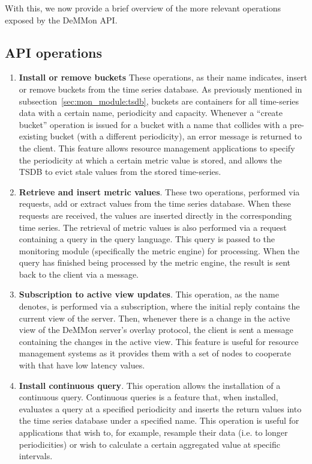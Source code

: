 With this, we now provide a brief overview of the more relevant operations exposed by the DeMMon API.

\subsection{API operations}

\begin{enumerate}
    \item \textbf{Install or remove buckets} These operations, as their name indicates, insert or remove buckets from the time series database. As previously mentioned in subsection~\ref{sec:mon_module:tsdb}, buckets are containers for all time-series data with a certain name, periodicity and capacity. Whenever a ``create bucket'' operation is issued for a bucket with a name that collides with a pre-existing bucket (with a different periodicity), an error message is returned to the client. This feature allows resource management applications to specify the periodicity at which a certain metric value is stored, and allows the TSDB to evict stale values from the stored time-series.
    
    \item \textbf{Retrieve and insert metric values}. These two operations, performed via requests, add or extract values from the time series database. When these requests are received, the values are inserted directly in the corresponding time series. The retrieval of metric values is also performed via a request containing a query in the query language. This query is passed to the monitoring module (specifically the metric engine) for processing. When the query has finished being processed by the metric engine, the result is sent back to the client via a message.
    
    \item \textbf{Subscription to active view updates}. This operation, as the name denotes, is performed via a subscription, where the initial reply contains the current view of the server. Then, whenever there is a change in the active view of the DeMMon server's overlay protocol, the client is sent a message containing the changes in the active view. This feature is useful for resource management systems as it provides them with a set of nodes to cooperate with that have low latency values.
    
    \item \textbf{Install continuous query}. This operation allows the installation of a continuous query. Continuous queries is a feature that, when installed, evaluates a query at a specified periodicity and inserts the return values into the time series database under a specified name. This operation is useful for applications that wish to, for example, resample their data (i.e. to longer periodicities) or wish to calculate a certain aggregated value at specific intervals. 


\end{enumerate}
